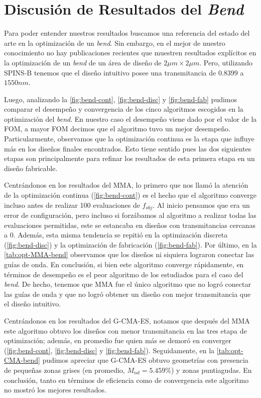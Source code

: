 \section{Discusión de Resultados del \emph{Bend}}

Para poder entender nuestros resultados buscamos una referencia del estado del arte
en la optimización de un \emph{bend}.
Sin embargo, en el mejor de nuestro conocimiento no hay publicaciones recientes que muestren
resultados explícitos en la optimización de un \emph{bend} de un área de diseño de $2 \mu m \times 2 \mu m$.
Pero, utilizando SPINS-B tenemos que el diseño intuitivo posee una transmitancia de $0.8399$ a $1550 nm$.

Luego, analizando la \autoref{fig:bend-cont}, \autoref{fig:bend-disc} y \autoref{fig:bend-fab}
pudimos comparar el desempeño y convergencia de los cinco algoritmos escogidos 
en la optimización del \emph{bend}.
En nuestro caso el desempeño viene dado por el valor de la FOM, a mayor FOM 
decimos que el algoritmo tuvo un mejor desempeño.
Particularmente, observamos que la optimización continua es la etapa que influye más
en los diseños finales encontrados. Esto tiene sentido pues las dos siguientes etapas
son principalmente para refinar los resultados de esta primera etapa en un diseño
fabricable.

Centrándonos en los resultados del MMA, lo primero que nos llamó
la atención de la optimización continua (\autoref{fig:bend-cont}) es el hecho que el algoritmo converge 
incluso antes de realizar 100 evaluaciones de $f_{obj}$. 
Al inicio pensamos que era un error de configuración,
pero incluso si forzábamos al algoritmo a realizar todas las evaluaciones permitidas, 
este se estancaba en diseños con transmitancias cercanas a 0.
Además, esta misma tendencia se repitió en la optimización discreta (\autoref{fig:bend-disc})
y la optimización de fabricación (\autoref{fig:bend-fab}).
Por último, en la \autoref{tab:opt-MMA-bend} observamos que los diseños 
ni siquiera lograron conectar las guías de onda.
En conclusión, si bien este algoritmo converge rápidamente, en términos de desempeño
es el peor algoritmo de los estudiados para el caso del \emph{bend}.
De hecho, tenemos que MMA fue el único algoritmo que no logró conectar las guías de onda y
que no logró obtener un diseño con mejor transmitancia que el diseño intuitivo.

Centrándonos en los resultados del G-CMA-ES, notamos que después del MMA este algoritmo
obtuvo los diseños con menor transmitancia en las tres etapa de optimización;
además, en promedio fue quien más se demoró en converger
(\autoref{fig:bend-cont}, \autoref{fig:bend-disc} y \autoref{fig:bend-fab}).
Seguidamente, en la \autoref{tab:opt-CMA-bend} pudimos apreciar que G-CMA-ES obtuvo geometrías 
con presencia de pequeñas zonas grises (en promedio, $M_{nd} = 5.459 \%$) y zonas puntiagudas.
En conclusión, tanto en términos de eficiencia como de convergencia este algoritmo no
mostró los mejores resultados.

